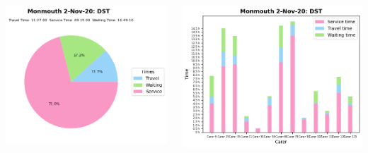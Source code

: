 \documentclass[usenames,dvipsnames]{beamer}
\begin{document}
\begin{frame}
\begin{columns}
\begin{minipage}[c][0.45\textheight][c]{\linewidth}
		\end{minipage}
		\begin{minipage}[c][0.45\textheight][c]{\linewidth}
			\centering
			\includegraphics[width=1\linewidth]{figures/2_Nov_20_Monmouth_time_info_dst}
		\end{minipage}
		\begin{minipage}[c][0.45\textheight][c]{\linewidth}
			\vspace{5mm}
			\centering
			\includegraphics[width=1\linewidth]{figures/2_Nov_20_Monmouth_workload_dst}
		\end{minipage}
	\end{columns}
\end{frame}
\end{document}
